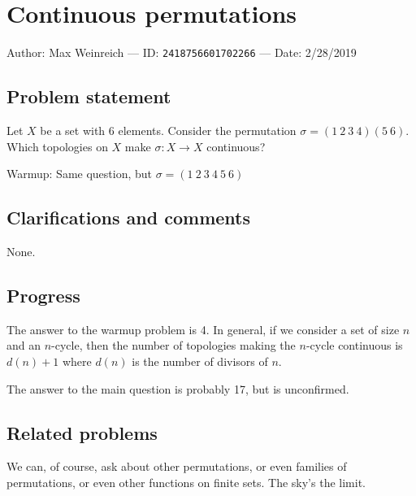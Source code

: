
\section{Continuous permutations}

Author: Max Weinreich --- ID: \verb`2418756601702266` --- Date: 2/28/2019

\subsection{Problem statement}

Let $X$ be a set with 6 elements. Consider the permutation $\sigma=(1\ 2\ 3\ 4)(5\ 6)$. Which topologies on $X$ make $\sigma:X\to X$ continuous?

Warmup: Same question, but $\sigma=(1\ 2\ 3\ 4\ 5\ 6)$

\subsection{Clarifications and comments}

None.

\subsection{Progress}

The answer to the warmup problem is 4. In general, if we consider a set of size $n$ and an $n$-cycle, then the number of topologies making the $n$-cycle continuous is $d(n)+1$ where $d(n)$ is the number of divisors of $n$.

The answer to the main question is probably 17, but is unconfirmed.

\subsection{Related problems}

We can, of course, ask about other permutations, or even families of permutations, or even other functions on finite sets. The sky's the limit.

